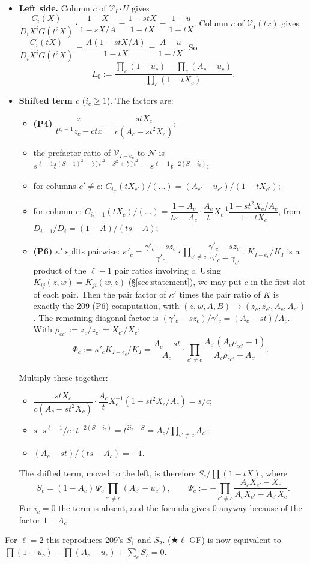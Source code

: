 \documentclass[11pt]{amsart}
\theoremstyle{remark}
\newcommand{\cV}{\mathcal{V}}
\newcommand{\cN}{\mathcal{N}}
\newcommand{\plab}[1]{\textbf{(#1)}}
\begin{document}
\begin{itemize}
\item \textbf{Left side.} Column $c$ of $\cV_I\cdot U$ gives $\dfrac{C_i(X)}{D_iX^iG(t^2X)}\cdot\dfrac{1-X}{1-sX/A}=\dfrac{1-stX}{1-tX}=\dfrac{1-u}{1-tX}$. Column $c$ of $\cV_I(tx)$ gives $\dfrac{C_i(tX)}{D_iX^iG(t^2X)}=\dfrac{A(1-stX/A)}{1-tX}=\dfrac{A-u}{1-tX}$. So
\[
L_0:=\frac{\prod_c(1-u_c)-\prod_c(A_c-u_c)}{\prod_c(1-tX_c)}.
\]
\item \textbf{Shifted term $c$} ($i_c\ge1$). The factors are:
\begin{itemize}
\item \plab{P4} $\dfrac{x}{t^{i_c-1}z_c-ctx}=\dfrac{stX_c}{c(A_c-st^2X_c)}$;
\item the prefactor ratio of $\cV_{I-e_c}$ to $\cN$ is $s^{\ell-1}t^{(S-1)^2-\sum i'^2-S^2+\sum i^2}=s^{\ell-1}t^{-2(S-i_c)}$;
\item for columns $c'\ne c$: $C_{i_{c'}}(tX_{c'})/(\dots)=(A_{c'}-u_{c'})/(1-tX_{c'})$;
\item for column $c$: $C_{i_c-1}(tX_c)/(\dots)=\dfrac{1-A_c}{ts-A_c}\cdot\dfrac{A_c}{t}X_c^{-1}\dfrac{1-st^2X_c/A_c}{1-tX_c}$, from $D_{i-1}/D_i=(1-A)/(ts-A)$;
\item \plab{P6} $\kappa'$ splits pairwise: $\kappa'_c=\dfrac{\gamma'_c-sz_c}{\gamma'_c}\cdot\prod_{c'\ne c}\dfrac{\gamma'_c-sz_{c'}}{\gamma'_c-\gamma_{c'}}$. $K_{I-e_c}/K_I$ is a product of the $\ell-1$ pair ratios involving $c$. Using $K_{ij}(z,w)=K_{ji}(w,z)$ (\S\ref{sec:statement}), we may put $c$ in the first slot of each pair. Then the pair factor of $\kappa'$ times the pair ratio of $K$ is exactly the 209 (P6) computation, with $(z,w,A,B)\to(z_c,z_{c'},A_c,A_{c'})$. The remaining diagonal factor is $(\gamma'_c-sz_c)/\gamma'_c=(A_c-st)/A_c$. With $\rho_{cc'}:=z_c/z_{c'}=X_{c'}/X_c$:
\[
\Phi_c:=\kappa'_cK_{I-e_c}/K_I=\frac{A_c-st}{A_c}\cdot\prod_{c'\ne c}\frac{A_{c'}(A_c\rho_{cc'}-1)}{A_c\rho_{cc'}-A_{c'}}.
\]
\end{itemize}
Multiply these together:
\begin{itemize}
\item $\dfrac{stX_c}{c(A_c-st^2X_c)}\cdot\dfrac{A_c}{t}X_c^{-1}(1-st^2X_c/A_c)=s/c$;
\item $s\cdot s^{\ell-1}/c\cdot t^{-2(S-i_c)}=t^{2i_c-S}=A_c\big/\prod_{c'\ne c}A_{c'}$;
\item $(A_c-st)/(ts-A_c)=-1$.
\end{itemize}
The shifted term, moved to the left, is therefore $S_c/\prod(1-tX)$, where
\[
S_c=(1-A_c)\,\Psi_c\prod_{c'\ne c}(A_{c'}-u_{c'}),\qquad \Psi_c:=-\prod_{c'\ne c}\frac{A_cX_{c'}-X_c}{A_cX_{c'}-A_{c'}X_c}.
\]
For $i_c=0$ the term is absent, and the formula gives $0$ anyway because of the factor $1-A_c$.
\end{itemize}
For $\ell=2$ this reproduces 209's $S_1$ and $S_2$. ($\bigstar\ell$-GF) is now equivalent to $\prod(1-u_c)-\prod(A_c-u_c)+\sum_cS_c=0$.
\end{document}
